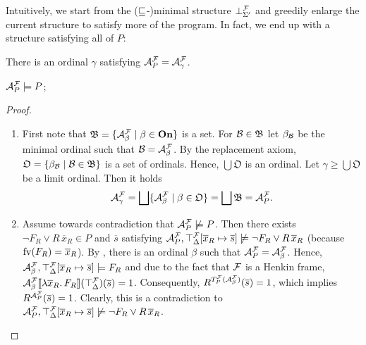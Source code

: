 \documentclass[a4paper,twoside,notitlepage,openright,11pt]{report}
\begin{document}
Intuitively, we start from the ($\sqsubseteq$-)minimal structure $\bot_{\Sigma'}^\mathcal F$ and greedily enlarge the current structure to satisfy more of the program. In fact, we end up with a structure satisfying all of $P$:
\begin{proposition}[Properties of $\As^\Hf_P$]
  \begin{thmlist}
  \item\label{lem:plateau} There is an ordinal $\gamma$ satisfying $\mathcal A^\mathcal F_P=\mathcal A^\mathcal F_\gamma$.
  \item\label{lem:modp}$\mathcal A^\mathcal F_P\models P$;
  \end{thmlist}
\end{proposition}
\begin{proof}
  \begin{enumerate}
  \item First note that $\mathfrak B=\{\mathcal A^\mathcal F_\beta\mid\beta\in\operatorname{\mathbf{On}}\}$ is a set. For $\mathcal B\in\mathfrak B$ let $\beta_\mathcal B$ be the minimal ordinal such that $\mathcal B=\mathcal A^\mathcal F_\beta$. By the replacement axiom, $\mathfrak O=\{\beta_\mathcal B\mid\mathcal B\in\mathfrak B\}$ is a set of ordinals. Hence, $\bigcup\mathfrak O$ is an ordinal. Let $\gamma\geq\bigcup\mathfrak O$ be a limit ordinal. Then it holds
    \begin{align*}
      \mathcal A^\mathcal F_\gamma=\bigsqcup\{\mathcal A^\mathcal F_\beta\mid\beta\in\mathfrak O\}=\bigsqcup\mathfrak B=\mathcal A^\mathcal F_P.
    \end{align*}
  \item Assume towards contradiction that $\mathcal A^\mathcal F_P\not\models P$. Then there exists $\neg F_R\lor R\,\overline x_R\in P$ and $\overline s$ satisfying $\mathcal A^\mathcal F_P,\top_\Delta^\mathcal F[\overline x_R\mapsto\overline s]\not\models\neg F_R\lor R\,\overline x_R$ (because $\operatorname{fv}(F_R)=\overline x_R$). By , there is an ordinal $\beta$ such that $\mathcal A^\mathcal F_P=\mathcal A^\mathcal F_\beta$. Hence, $\mathcal A^\mathcal F_\beta,\top_\Delta^\mathcal F[\overline x_R\mapsto\overline s]\models F_R$ and due to the fact that $\mathcal F$ is a Henkin frame, ${\mathcal A^\mathcal F_\beta}\llbracket\lambda\overline x_R\ldotp F_R\rrbracket(\top_\Delta^\mathcal F)(\overline s)=1$.
    Consequently, $R^{T_P^\mathcal F(\mathcal A^\mathcal F_\beta)}(\overline s)=1$, which implies $R^{\mathcal A^\mathcal F_P}(\overline s)=1$. Clearly, this is a contradiction to $\mathcal A^\mathcal F_P,\top_\Delta^\mathcal F[\overline x_R\mapsto\overline s]\not\models\neg F_R\lor R\,\overline x_R$.\qedhere
  \end{enumerate}
\end{proof}
\end{document}
